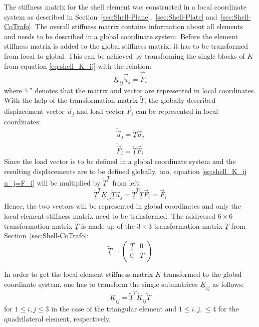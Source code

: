  The stiffness matrix for the shell element was constructed in a local coordinate system as described in Section~\ref{sec:Shell-Plane},~\ref{sec:Shell-Plate} and~\ref{sec:Shell-CoTrafo}. The overall stiffness matrix contains information about all elements and needs to be described in a global coordinate system. Before the element stiffness matrix is added to the global stiffness matrix, it has to be transformed from local to global. This can be achieved by transforming the single blocks of $\underline{K}$ from equation \eqref{eq:shell_K_ij} with the relation:
 \begin{equation}\label{eq:shell_K_ij u_j=F_i}
 \underline{\check{K}}_{ij} \vec{\check{u}}_j = \vec{\check{F}}_i
 \end{equation}
 where ``\;$\check{\ }$\;'' denotes that the matrix and vector are represented in local coordinates. With the help of the transformation matrix $\underline{\tilde{T}}$, the globally described displacement vector $\vec{u}_j$ and load vector $\vec{F}_i$ can be represented in local coordinates:
 \begin{align}
 \check{\vec{u}}_j = \underline{\tilde{T}} \vec{u}_j\\
 \check{\vec{F}}_i = \underline{\tilde{T}} \vec{F}_i
 \end{align}
 Since the load vector is to be defined in a global coordinate system and the resulting displacements are to be defined globally, too, equation \eqref{eq:shell_K_ij u_j=F_i} will be multiplied by $\underline{\tilde{T}}^T$ from left:
 \begin{equation}
 \underline{\tilde{T}}^T \underline{\check{K}}_{ij} \underline{\tilde{T}} \vec{u}_j = \underline{\tilde{T}}^T \underline{\tilde{T}} \vec{F}_i = \vec{F}_i
 \end{equation}
 Hence, the two vectors will be represented in global coordinates and only the local element stiffness matrix need to be transformed. The addressed $6\!\times\!6$ transformation matrix $\underline{\tilde{T}}$ is made up of the $3\!\times\!3$ transformation matrix $\underline{T}$ from Section~\ref{sec:Shell-CoTrafo}:
 \begin{equation}\label{eq:trafoTtilde}
 \underline{\tilde{T}} = \begin{pmatrix}
 \underline{T} & 0\\
 0 & \underline{T}
 \end{pmatrix}
 \end{equation}
 
 In order to get the local element stiffness matrix $\underline{K}$ transformed to the global coordinate system, one has to transform the single submatrices $\underline{K}_{ij}$ as follows:
 \begin{equation}\label{eq:Kij=Tt Kij T}
 \underline{K}_{ij} = \underline{\tilde{T}}^T \underline{\check{K}}_{ij} \underline{\tilde{T}}
 \end{equation}
 for $1 \leq i,j \leq 3$ in the case of the triangular element and $1 \leq i,j, \leq 4$ for the quadrilateral element, respectively.